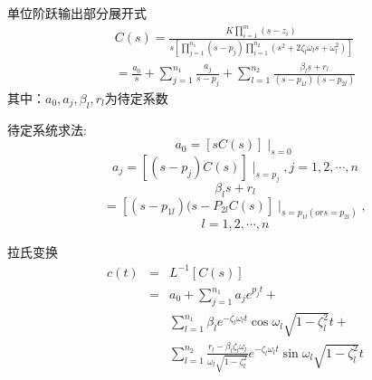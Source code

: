 \begin{frame}
\begin{block}{单位阶跃输出部分展开式}
\begin{eqnarray*}
C(s)=\frac{K\prod\limits_{i=1}^m(s-z_i)}{s[\prod\limits_{j=1}^{n_1}(s-p_j)\prod\limits_{i=1}^{n_2}(s^2+2\zeta_l\omega_ls+\omega_l^2)]}\\
=\frac{a_0}{s}+\sum_{j=1}^{n_1}\frac{a_j}{s-p_j}+\sum_{l=1}^{n_2}\frac{\beta_ls+r_l}{(s-p_{1l})(s-p_{2l})}
\end{eqnarray*}
其中：$a_0,a_j,\beta_l,r_l$为待定系数
\end{block}
\end{frame}
\begin{frame}
待定系统求法:
\[a_0=[sC(s)]\mid_{s=0}\]
\[a_j=[(s-p_j)C(s)]\mid_{s=p_j},j=1,2,\cdots ,n\]
\[\beta_ls+r_l \]
\[=[(s-p_{1l})(s-P_{2l}C(s)]\mid_{s=p_{1l}(or s=p_{2l})},\]
\[l=1,2,\cdots ,n\]
\end{frame}
\begin{frame}
\begin{block}{拉氏变换}
\begin{eqnarray*}
c(t)&=&L^{-1}[C(s)]\\
&=&a_0+\sum_{j=1}^{n_1}a_je^{p_jt}+\\
&&\sum_{l=1}^{n_1}\beta_le^{-\zeta_l\omega_lt}\cos\omega_l\sqrt{1-\zeta^2_l}t+\\
&&\sum_{l=1}^{n_2}\frac{r_l-\beta_l\zeta_l\omega_l}{\omega_l\sqrt{1-\zeta_l^2}}e^{-\zeta_l\omega_lt}\sin\omega_l\sqrt{1-\zeta_l^2}t
\end{eqnarray*}
\end{block}
\end{frame}

